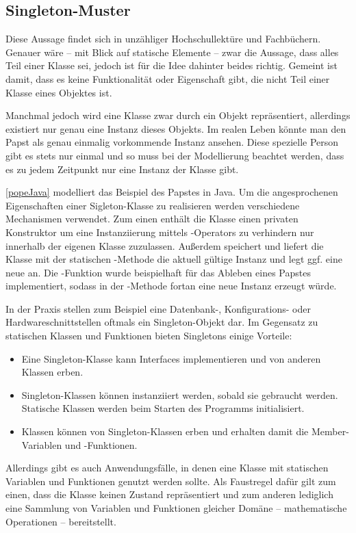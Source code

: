 \subsection{Singleton-Muster}
 \cite{susanne_hackmack_objekte_2018} Diese Aussage findet sich in unzähliger Hochschullektüre und Fachbüchern. Genauer wäre -- mit Blick auf statische Elemente -- zwar die Aussage, dass alles Teil einer Klasse sei, jedoch ist für die Idee dahinter beides richtig. Gemeint ist damit, dass es keine Funktionalität oder Eigenschaft gibt, die nicht Teil einer Klasse \bzw eines Objektes ist.

Manchmal jedoch wird eine Klasse zwar durch ein Objekt repräsentiert, allerdings existiert nur genau eine Instanz dieses Objekts. Im realen Leben könnte man \zB den Papst als genau einmalig vorkommende Instanz ansehen. Diese spezielle Person gibt es stets nur einmal und so muss bei der Modellierung beachtet werden, dass es zu jedem Zeitpunkt nur eine Instanz der Klasse gibt.


\autoref{popeJava} modelliert das Beispiel des Papstes in Java. Um die angesprochenen Eigenschaften einer Sigleton-Klasse zu realisieren werden verschiedene Mechanismen verwendet. Zum einen enthält die Klasse einen privaten Konstruktor um eine Instanziierung mittels -Operators zu verhindern \bzw nur innerhalb der eigenen Klasse zuzulassen. Außerdem speichert und liefert die Klasse mit der statischen -Methode die aktuell gültige Instanz und legt ggf. eine neue an. Die -Funktion wurde beispielhaft für das Ableben eines Papstes implementiert, sodass in der -Methode fortan eine neue Instanz erzeugt würde.

In der Praxis stellen zum Beispiel eine Datenbank-, Konfigurations- oder Hardwareschnittstellen oftmals ein Singleton-Objekt dar. Im Gegensatz zu statischen Klassen und Funktionen bieten Singletons einige Vorteile:

\begin{itemize}
    \item Eine Singleton-Klasse kann Interfaces implementieren und von anderen Klassen erben.
    \item Singleton-Klassen können instanziiert werden, sobald sie gebraucht werden. Statische Klassen werden beim Starten des Programms initialisiert.
    \item Klassen können von Singleton-Klassen erben und erhalten damit die Member-Variablen und -Funktionen.
\end{itemize}

Allerdings gibt es auch Anwendungsfälle, in denen eine Klasse mit statischen Variablen und Funktionen genutzt werden sollte. Als Faustregel dafür gilt zum einen, dass die Klasse keinen Zustand repräsentiert und zum anderen lediglich eine Sammlung von Variablen und Funktionen gleicher Domäne -- \zB mathematische Operationen -- bereitstellt.